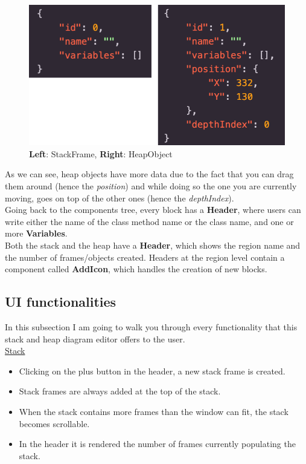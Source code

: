 \documentclass[]{usiinfbachelorproject}
\begin{document}
\begin{figure}[h!]
\centering
\includegraphics[scale=.3]{figures/blocks_data.png}
\caption {\textbf{Left}: StackFrame, \textbf{Right}: HeapObject}
\label{tree}
\end{figure}

\noindent As we can see, heap objects have more data due to the fact that you can drag them around (hence the \emph{position}) and while doing so the one you are currently moving, goes on top of the other ones (hence the \emph{depthIndex}).\\
Going back to the components tree, every block has a \textbf{Header}, where users can write either the name of the class method name or the class name, and one or more \textbf{Variables}.\\
Both the stack and the heap have a \textbf{Header}, which shows the region name and the number of frames/objects created. Headers at the region level contain a component called \textbf{AddIcon}, which handles the creation of new blocks.

\subsection{UI functionalities}

In this subsection I am going to walk you through every functionality that this stack and heap diagram editor offers to the user.\\

\ul{Stack}

\begin{itemize}
	\item Clicking on the plus button in the header, a new stack frame is created.
	\item Stack frames are always added at the top of the stack.
	\item When the stack contains more frames than the window can fit, the stack becomes scrollable. 
	\item In the header it is rendered the number of frames currently populating the stack.
\end{itemize}\
\end{document}
